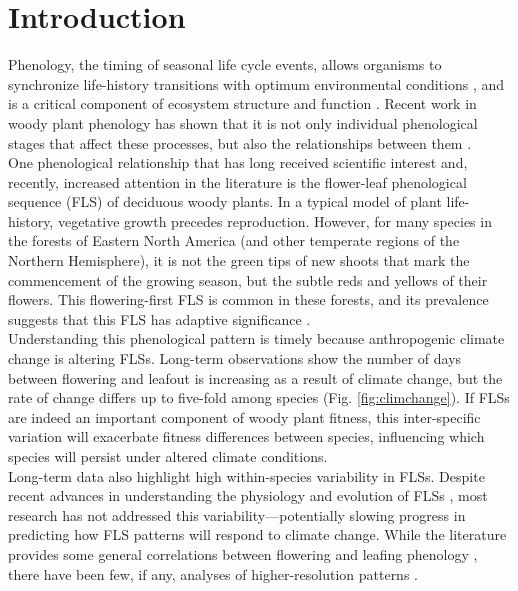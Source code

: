 \documentclass[12pt]{article}
\begin{document}
\section*{Introduction}
Phenology, the timing of seasonal life cycle events, allows organisms to synchronize life-history transitions with optimum environmental conditions \citep{Forrest2010}, and is a critical component of ecosystem structure and function \citep{Cleland2007,Piao2007}. Recent work in woody plant phenology has shown that it is not only individual phenological stages that affect these processes, but also the relationships between them \citep{Ettinger2018}.\\

\noindent One phenological relationship that has long received scientific interest \citep[see][]{Robertson1895} and, recently, increased attention in the literature \citep{Savage2019, Gougherty2018} is the flower-leaf phenological sequence (FLS) of deciduous woody plants. In a typical model of plant life-history, vegetative growth precedes reproduction. However, for many species in the forests of Eastern North America (and other temperate regions of the Northern Hemisphere), it is not the green tips of new shoots that mark the commencement of the growing season, but the subtle reds and yellows of their flowers. This flowering-first FLS is common in these forests, and its prevalence suggests that this FLS has adaptive significance \citep{Rathcke_1985}.\\ 

\noindent Understanding this phenological pattern is timely because anthropogenic climate change is altering FLSs. Long-term observations show the number of days between flowering and leafout is increasing as a result of climate change, but the rate of change differs up to five-fold among species (Fig. \ref{fig:climchange}).  If FLSs are indeed an important component of woody plant fitness, this inter-specific variation will exacerbate fitness differences between species, influencing which species will persist under altered climate conditions.\\ 

\noindent Long-term data also highlight high within-species variability in FLSs. Despite recent advances in understanding the physiology and evolution of FLSs \citep{Gougherty2018,Savage2019}, most research has not addressed this variability---potentially slowing progress in predicting how FLS patterns will respond to climate change. While the literature provides some general correlations between flowering and leafing phenology \citep{Lechowicz_1995, Ettinger2018}, there have been few, if any, analyses of higher-resolution patterns \citep{Gougherty2018}. \\
\end{document}

